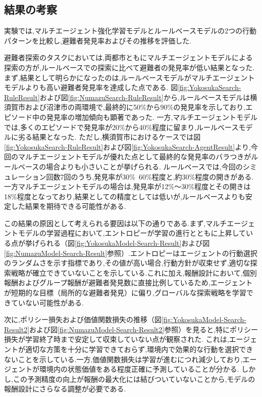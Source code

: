 \subsection{結果の考察}
実験では,マルチエージェント強化学習モデルとルールベースモデルの2つの行動パターンを比較し,避難者発見率およびその推移を評価した.

避難者探索のタスクにおいては,両都市ともにマルチエージェントモデルによる探索の方が,ルールベースでの探索に比べて避難者の発見率が低い結果となった.
まず,結果として明らかになったのは,ルールベースモデルがマルチエージェントモデルよりも高い避難者発見率を達成した点である.
図\ref{fig:YokosukaSearch-RuleResult}および図\ref{fig:NumazuSearch-RuleResult}から,ルールベースモデルは横須賀市および沼津市の両環境で,最終的に50\%から90\%の発見率を示しており,エピソード中の発見率の増加傾向も顕著であった.
一方,マルチエージェントモデルでは,多くのエピソードで発見率が20\%から40\%程度に留まり,ルールベースモデルに劣る結果となった.
ただし,横須賀市におけるケースでは図\ref{fig:YokosukaSearch-RuleResult}および図\ref{fig:YokosukaSearch-AgentResult}より,今回のマルチエージェントモデルが優れた点として最終的な発見率のバラつきがルールベースの場合よりも小さいことが挙げられる.
ルールベースでは,今回のシミュレーション回数7回のうち,発見率が30\%~60\%程度と,約30\%程度の開きがある.
一方マルチエージェントモデルの場合は,発見率が12\%～30\%程度とその開きは18\%程度となっており,結果としての精度としては低いが,ルールベースよりも安定した結果を期待できる可能性がある.


この結果の原因として考えられる要因は以下の通りである.まず,マルチエージェントモデルの学習過程において,エントロピーが学習の進行とともに上昇している点が挙げられる（図\ref{fig:YokosukaModel-Search-Result}および図\ref{fig:NumazuModel-Search-Result}参照）.エントロピーはエージェントの行動選択のランダムさを示す指標であり,その値が高い場合,行動方針が収束せず,適切な探索戦略が確立できていないことを示している.これに加え,報酬設計において,個別報酬およびグループ報酬が避難者発見数に直接比例しているため,エージェントが短期的な目標（局所的な避難者発見）に偏り,グローバルな探索戦略を学習できていない可能性がある.

次に,ポリシー損失および価値関数損失の推移（図\ref{fig:YokosukaModel-Search-Result2}および図\ref{fig:NumazuModel-Search-Result2}参照）を見ると,特にポリシー損失が学習終了時まで安定して収束していない点が観察された.
これは,エージェントが適切な方策を十分に学習できておらず,環境内で効果的な行動を選択できないことを示している.一方,価値関数損失は学習が進むにつれ減少しており,エージェントが環境内の状態価値をある程度正確に予測していることが分かる.
しかし,この予測精度の向上が報酬の最大化には結びついていないことから,モデルの報酬設計にさらなる調整が必要である.


